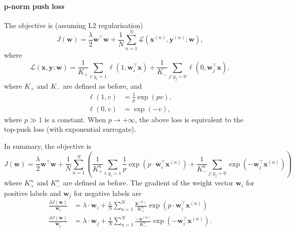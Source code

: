 \documentclass[9pt]{extarticle}
\newcommand{\x}{\mathbf{x}}
\newcommand{\y}{\mathbf{y}}
\newcommand{\1}{\mathbf{1}}
\newcommand{\w}{\mathbf{w}}
\newcommand{\LCal}{\mathcal{L}}
\newcommand{\pb}[1]{^{({#1})}}
\begin{document}
\paragraph{p-norm push loss}
The objective is (assuming L2 regularisation)
\begin{equation*}
J(\w) = \frac{\lambda}{2}\w^\top \w + \frac{1}{N} \sum_{n=1}^N \LCal(\x\pb{n}, \y\pb{n}; \w),
\end{equation*}
where
\begin{equation*}
\LCal(\x, \y; \w) = \frac{1}{K_+} \sum_{i:y_i=1} \ell(1, \w_i^\top \x) + \frac{1}{K_-} \sum_{j:y_j=0} \ell(0, \w_j^\top \x),
\end{equation*}
where $K_+$ and $K_-$ are defined as before, and
\begin{align}
\ell(1, v) & = \frac{1}{p} \exp(pv), \\
\ell(0, v) & = \exp(-v),
\end{align}
where $p \gg 1$ is a constant.
When $p \to +\infty$, the above loss is equivalent to the top-push loss (with exponential surrogate).

In summary, the objective is
\begin{equation}
\label{eq:obj_pnorm_push}
J(\w) = \frac{\lambda}{2} \w^\top \w + \frac{1}{N} \sum_{n=1}^N \left( \frac{1}{K_+^n} \sum_{i:y_i=1} \frac{1}{p} \exp(p \cdot \w_i^\top \x\pb{n}) +
        \frac{1}{K_-^n} \sum_{j:y_j=0} \exp(-\w_j^\top \x\pb{n}) \right)
\end{equation}
where $K_+^n$ and $K_-^n$ are defined as before.
The gradient of the weight vector $\w_i$ for positive labels and $\w_j$ for negative labels are
\begin{align}
\frac{\partial J(\w)}{\w_i} & = \lambda \cdot \w_i + \frac{1}{N} \sum_{n=1}^N \frac{\x\pb{n}}{K_+^n} \exp(p \cdot \w_i^\top \x\pb{n}) \\
\frac{\partial J(\w)}{\w_j} & = \lambda \cdot \w_j + \frac{1}{N} \sum_{n=1}^N \frac{-\x\pb{n}}{K_-^n} \exp(-\w_i^\top \x\pb{n}).
\end{align}
\end{document}
